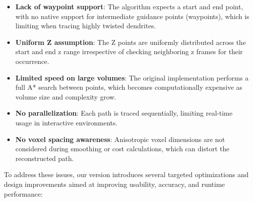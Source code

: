 \begin{itemize}

     \item{\textbf{Lack of waypoint support}: The algorithm expects a start and end point, with no native support for intermediate guidance points (waypoints), which is limiting when tracing highly twisted dendrites.}


    \item{\textbf{Uniform Z assumption}: The Z points are uniformly distributed across the start and end z range irrespective of checking neighboring z frames for their occurrence.}
    
    \item{\textbf{Limited speed on large volumes}: The original implementation performs a full A* search between points, which becomes computationally expensive as volume size and complexity grow.}
    
    \item{\textbf{No parallelization}: Each path is traced sequentially, limiting real-time usage in interactive environments.}
    
    \item{\textbf{No voxel spacing awareness}: Anisotropic voxel dimensions are not considered during smoothing or cost calculations, which can distort the reconstructed path.}

\end{itemize}

To address these issues, our version introduces several targeted optimizations and design improvements aimed at improving usability, accuracy, and runtime performance:

